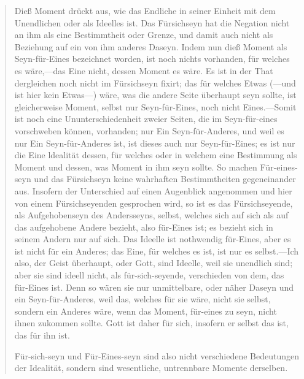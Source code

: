 \documentclass{article}
\begin{document}
\begin{quote}
    Dieß Moment drückt aus, wie das Endliche in seiner Einheit mit dem Unendlichen oder als Ideelles ist. Das Fürsichseyn hat die Negation nicht an ihm als eine Bestimmtheit oder Grenze, und damit auch nicht als Beziehung auf ein von ihm anderes Daseyn. Indem nun dieß Moment als Seyn-für-Eines bezeichnet worden, ist noch nichts vorhanden, für welches es wäre,—das Eine nicht, dessen Moment es wäre. Es ist in der That dergleichen noch nicht im Fürsichseyn fixirt; das für welches Etwas (—und ist hier kein Etwas—) wäre, was die andere Seite überhaupt seyn sollte, ist gleicherweise Moment, selbst nur Seyn-für-Eines, noch nicht Eines.—Somit ist noch eine Ununterschiedenheit zweier Seiten, die im Seyn-für-eines vorschweben können, vorhanden; nur Ein Seyn-für-Anderes, und weil es nur Ein Seyn-für-Anderes ist, ist dieses auch nur Seyn-für-Eines; es ist nur die Eine ldealität dessen, für welches oder in welchem eine Bestimmung als Moment und dessen, was Moment in ihm seyn sollte. So machen Für-eines-seyn und das Fürsichseyn keine wahrhaften Bestimmtheiten gegeneinander aus. Insofern der Unterschied auf einen Augenblick angenommen und hier von einem Fürsichseyenden gesprochen wird, so ist es das Fürsichseyende, als Aufgehobenseyn des Andersseyns, selbst, welches sich auf sich als auf das aufgehobene Andere bezieht, also für-Eines ist; es bezieht sich in seinem Andern nur auf sich. Das Ideelle ist nothwendig für-Eines, aber es ist nicht für ein Anderes; das Eine, für welches es ist, ist nur es selbst.—Ich also, der Geist überhaupt, oder Gott, sind Ideelle, weil sie unendlich sind; aber sie sind ideell nicht, als für-sich-seyende, verschieden von dem, das für-Eines ist. Denn so wären sie nur unmittelbare, oder näher Daseyn und ein Seyn-für-Anderes, weil das, welches für sie wäre, nicht sie selbst, sondern ein Anderes wäre, wenn das Moment, für-eines zu seyn, nicht ihnen zukommen sollte. Gott ist daher für sich, insofern er selbst das ist, das für ihn ist.

    Für-sich-seyn und Für-Eines-seyn sind also nicht verschiedene
    Bedeutungen der Idealität, sondern sind wesentliche, untrennbare
    Momente derselben.
\end{quote}
\end{document}
